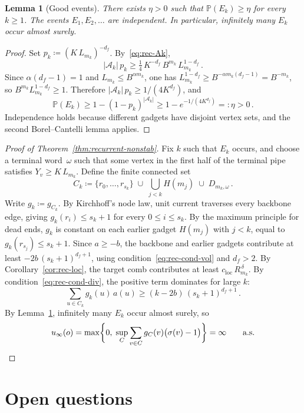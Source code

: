 \documentclass[aop]{imsart}
\theoremstyle{plain}
\newtheorem{lemma}[theorem]{Lemma}
\theoremstyle{definition}
\renewcommand{\P}{\mathbb{P}}
\begin{document}
	\begin{lemma}[Good events]\label{lem:rec-good}
		There exists $\eta>0$ such that $\P(E_k)\geq\eta$ for every $k\geq 1$.  The events $E_1,E_2,\ldots$ are independent.  In particular, infinitely many $E_k$ occur almost surely.
	\end{lemma}
	
	\begin{proof}
		Set $p_k\coloneqq(K\,L_{m_k})^{-d_f}$.  By~\eqref{eq:rec-Ak},
		\[
		|\mathcal{A}_k|\,p_k
		\geq\tfrac{1}{4}\,K^{-d_f}\,
		B^{m_k}\,L_{m_k}^{1-d_f}\,.
		\]
		Since $\alpha(d_f{-}1)=1$ and $L_{m_k}\leq B^{\alpha m_k}$, one has $L_{m_k}^{1-d_f}\geq B^{-\alpha m_k(d_f-1)} =B^{-m_k}$, so $B^{m_k}L_{m_k}^{1-d_f}\geq 1$.  Therefore $|\mathcal{A}_k|\,p_k\geq 1/(4K^{d_f})$, and
		\[
		\P(E_k)
		\geq 1-(1-p_k)^{|\mathcal{A}_k|}
		\geq 1-e^{-1/(4K^{d_f})}
		=:\eta>0\,.
		\]
		Independence holds because different gadgets have disjoint vertex sets, and the second Borel--Cantelli lemma applies.
	\end{proof}
	
	\begin{proof}[Proof of Theorem~\ref{thm:recurrent-nonstab}]
		Fix $k$ such that $E_k$ occurs, and choose a terminal word~$\omega$ such that some vertex in the first half of the terminal pipe satisfies $Y_v\geq K\,L_{m_k}$.  Define the finite connected set
		\[
		C_k\coloneqq\{r_0,\ldots,r_{s_k}\}
		\;\cup\;\bigcup_{j<k}H(m_j)
		\;\cup\;D_{m_k,\omega}\,.
		\]
		Write $g_k\coloneqq g_{C_k}$.  By Kirchhoff's node law, unit current traverses every backbone edge, giving $g_k(r_i)\leq s_k{+}1$ for every $0\leq i\leq s_k$.  By the maximum principle for dead ends, $g_k$ is constant on each earlier gadget $H(m_j)$ with $j<k$, equal to $g_k(r_{s_j})\leq s_k{+}1$.  Since $a\geq -b$, the backbone and earlier gadgets contribute at least $-2b\,(s_k{+}1)^{d_f+1}$, using condition~\eqref{eq:rec-cond-vol} and $d_f>2$.  By Corollary~\ref{cor:rec-loc}, the target comb contributes at least $c_{\mathrm{loc}}\,R_{m_k}^{\,\delta}$.  By condition~\eqref{eq:rec-cond-div}, the positive term dominates for large $k$:
		\[
		\sum_{u\in C_k}g_k(u)\,a(u)\geq (k-2b)\,(s_k{+}1)^{d_f+1}\,.
		\]
		By Lemma~\ref{lem:rec-good}, infinitely many $E_k$ occur almost surely, so
		\[
		u_\infty(o)
		=\max\biggl\{0,\;\sup_C\sum_{v\in C} g_C(v)\bigl(\sigma(v)-1\bigr)\biggr\}
		=\infty\qquad\text{a.s.}\qedhere
		\]
	\end{proof}
	
	\section{Open questions}
	
\end{document}
